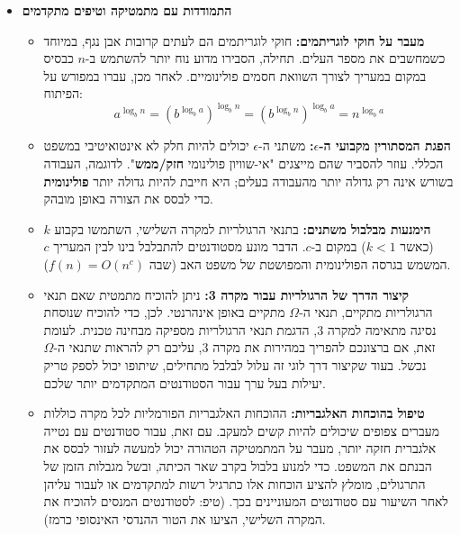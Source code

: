 \documentclass[11pt, a4paper]{article}
\begin{document}
\begin{itemize}
    \item \textbf{התמודדות עם מתמטיקה וטיפים מתקדמים}
    \begin{itemize}
        \item \textbf{מעבר על חוקי לוגריתמים:} חוקי לוגריתמים הם לעתים קרובות אבן נגף, במיוחד כשמחשבים את מספר העלים. תחילה, הסבירו מדוע נוח יותר להשתמש ב-$n$ כבסיס במקום במעריך לצורך השוואת חסמים פולינומיים. לאחר מכן, עברו במפורש על הפיתוח: 
        \[ a^{\log_b n} = (b^{\log_b a})^{\log_b n} = (b^{\log_b n})^{\log_b a} = n^{\log_b a} \]
        \item \textbf{הפגת המסתורין מקבועי ה-$\epsilon$:} משתני ה-$\epsilon$ יכולים להיות חלק לא אינטואיטיבי במשפט הכללי. עוזר להסביר שהם מייצגים "אי-שוויון פולינומי \textbf{חזק/ממש}". לדוגמה, העבודה בשורש אינה רק גדולה יותר מהעבודה בעלים; היא חייבת להיות גדולה יותר \textbf{פולינומית} כדי לבסס את הצורה באופן מובהק.
        \item \textbf{הימנעות מבלבול משתנים:} בתנאי הרגולריות למקרה השלישי, השתמשו בקבוע $k$ (כאשר $k < 1$) במקום ב-$c$. הדבר מונע מסטודנטים להתבלבל בינו לבין המעריך $c$ המשמש בגרסה הפולינומית והמפושטת של משפט האב (שבה $f(n) = O(n^c)$).
        \item \textbf{קיצור הדרך של הרגולריות עבור מקרה 3:} ניתן להוכיח מתמטית שאם תנאי הרגולריות מתקיים, תנאי ה-$\Omega$ מתקיים באופן אינהרנטי. לכן, כדי להוכיח שנוסחת נסיגה מתאימה למקרה 3, הדגמת תנאי הרגולריות מספיקה מבחינה טכנית. לעומת זאת, אם ברצונכם להפריך במהירות את מקרה 3, עליכם רק להראות שתנאי ה-$\Omega$ נכשל. בעוד שקיצור דרך לוגי זה עלול לבלבל מתחילים, שיתופו יכול לספק טריק יעילות בעל ערך עבור הסטודנטים המתקדמים יותר שלכם.
        \item \textbf{טיפול בהוכחות האלגבריות:} ההוכחות האלגבריות הפורמליות לכל מקרה כוללות מעברים צפופים שיכולים להיות קשים למעקב. עם זאת, עבור סטודנטים עם נטייה אלגברית חזקה יותר, מעבר על המתמטיקה הטהורה יכול למעשה לעזור לבסס את הבנתם את המשפט. כדי למנוע בלבול בקרב שאר הכיתה, ובשל מגבלות הזמן של התרגולים, מומלץ להציע הוכחות אלו כתרגיל רשות למתקדמים או לעבור עליהן לאחר השיעור עם סטודנטים המעוניינים בכך. (טיפ: לסטודנטים המנסים להוכיח את המקרה השלישי, הציעו את הטור ההנדסי האינסופי כרמז).
    \end{itemize}

\end{itemize}
\end{document}
